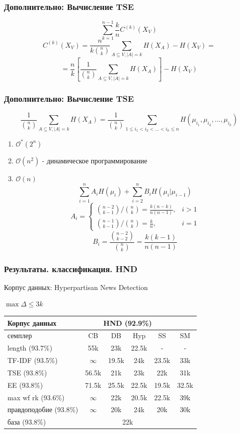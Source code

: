 \documentclass{beamer}
\begin{document}
\begin{frame}[label=supplemental,noframenumbering]
	\frametitle{Дополнительно: Вычисление TSE}
	\[
	\sum\limits_{k=1}^{n-1}\frac{k}{n}C^{(k)}(X_V)
	\]
	\[
	C^{(k)}(X_V) = \frac{n}{k\binom{n}{k}}\sum\limits_{A\subseteq V,|A|=k}H(X_A) - H(X_V) =
	\]
	\[
	= \frac{n}{k}\left[\frac{1}{\binom{n}{k}}\sum\limits_{A\subseteq V,|A|=k}H(X_A)\right] - H(X_V)
	\]
\end{frame}

\begin{frame}[label=supplemental,noframenumbering]
	\frametitle{Дополнительно: Вычисление TSE}
	\[
	\frac{1}{\binom{n}{k}}\sum\limits_{A\subseteq V,|A|=k}H(X_A) =
	\frac{1}{\binom{n}{k}}\sum\limits_{1 \le i_1 < i_2 < \ldots < i_k \le n}H(\mu_{i_1}, \mu_{i_2}, \ldots, \mu_{i_k})
	\]
	\begin{enumerate}
		\item $\mathcal{O^*}(2^n)$
		\item $\mathcal{O}(n^2)$ - динамическое программирование
		\item $\mathcal{O}(n)$
		\[
		\sum\limits_{i=1}^{n}A_iH(\mu_i) + \sum\limits_{i=2}^{n}B_iH(\mu_i|\mu_{i-1})
		\]
		\[
		A_i = 
		\begin{cases}
		\binom{n-2}{k-1}/\binom{n}{k}=\frac{k(n-k)}{n(n-1)},& i > 1 \\
		\binom{n-1}{k-1}/\binom{n}{k}=\frac k n,& i = 1
		\end{cases}
		\]
		\[
		B_i = \frac{\binom{n-2}{k-2}}{\binom{n}{k}} = \frac{k(k-1)}{n(n-1)}
		\]
	\end{enumerate}
\end{frame}

\begin{frame}
	\frametitle{Результаты. классификация. HND}
	
	Корпус данных: Hyperpartisan News Detection
	
	$\max\Delta \le 3k$
	\begin{table}
		\begin{tabular}{l|ccccc}
			Корпус данных & \multicolumn{4}{c}{HND (92.9\%)}\\
			\hline
			семплер & CB & DB & Hyp & SS & SM\\
			\hline
			length (93.7\%) & 55k & 23k & 22.5k & - & -\\
			TF-IDF (93.5\%) & $\infty$ & 19.5k & 24k & 23.5k & 33k\\
			TSE (93.8\%) & 56.5k & 21k & 23k & 22k & 31k\\
			EE (93.8\%) & 71.5k & 25.5k & 22.5k & 19.5k & 32.5k\\
			max wf rk (93.6\%) & $\infty$ & 22k & 20.5k & 22.5k & 39k\\
			правдоподобие (93.8\%) & $\infty$ & 20k & 24k & 20k & 30k\\
			\hline
			база (93.8\%) & \multicolumn{4}{c}{22k}
		\end{tabular}
	\end{table}
\end{frame}
\end{document}
